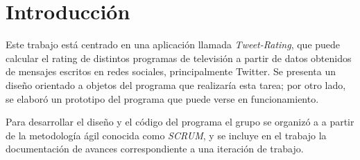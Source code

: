 
\section{Introducción}


Este trabajo está centrado en una aplicación llamada \textit{Tweet-Rating}, que puede calcular el rating de distintos programas de televisión a partir de datos obtenidos de mensajes escritos en redes sociales, principalmente Twitter. Se presenta un diseño orientado a objetos del programa que realizaría esta tarea; por otro lado, se elaboró un prototipo del programa que puede verse en funcionamiento.

Para desarrollar el diseño y el código del programa el grupo se organizó a a partir de la metodología ágil conocida como \textit{SCRUM}, y se incluye en el trabajo la documentación de avances correspondiente a una iteración de trabajo.